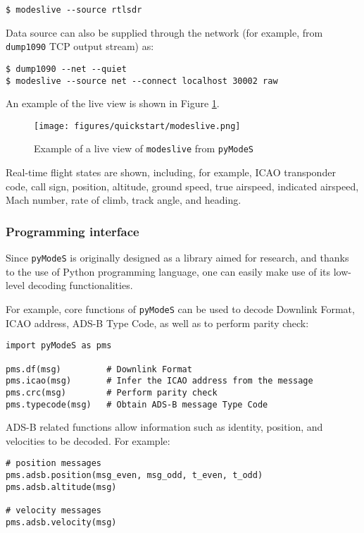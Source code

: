 \begin{verbatim}
$ modeslive --source rtlsdr
\end{verbatim}

Data source can also be supplied through the network (for example, from \texttt{dump1090} TCP output stream) as:



\begin{verbatim}
$ dump1090 --net --quiet
$ modeslive --source net --connect localhost 30002 raw
\end{verbatim}

An example of the live view is shown in Figure \ref{fig:modeslive}.

\begin{figure}[ht]
  \centering
  \texttt{[image: figures/quickstart/modeslive.png]}
  \caption{Example of a live view of \texttt{modeslive} from \texttt{pyModeS}}
  \label{fig:modeslive}
\end{figure}

Real-time flight states are shown, including, for example, ICAO transponder code, call sign, position,  altitude, ground speed, true airspeed, indicated airspeed, Mach number, rate of climb, track angle, and heading.

\subsubsection{Programming interface}

Since \texttt{pyModeS} is originally designed as a library aimed for research, and thanks to the use of Python programming language, one can easily make use of its low-level decoding functionalities.

For example, core functions of \texttt{pyModeS} can be used to decode Downlink Format, ICAO address, ADS-B Type Code, as well as to perform parity check:

\begin{verbatim}
import pyModeS as pms

pms.df(msg)         # Downlink Format
pms.icao(msg)       # Infer the ICAO address from the message
pms.crc(msg)        # Perform parity check
pms.typecode(msg)   # Obtain ADS-B message Type Code
\end{verbatim}


ADS-B related functions allow information such as identity, position, and velocities to be decoded. For example:

\begin{verbatim}
# position messages
pms.adsb.position(msg_even, msg_odd, t_even, t_odd)
pms.adsb.altitude(msg)

# velocity messages
pms.adsb.velocity(msg)
\end{verbatim}

